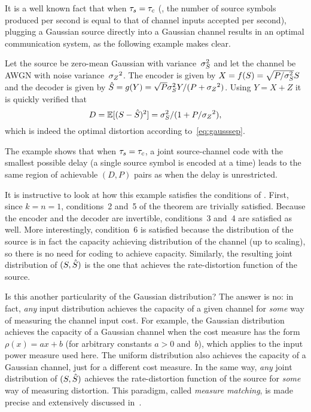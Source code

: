 It is a well known fact that when ${\tau_s} = {\tau_c}$ (\ie, the number of source symbols
produced per second is equal to that of channel inputs accepted per second),
plugging a Gaussian source directly into a Gaussian channel results in an
optimal communication system, as the following example makes clear.

\begin{example}
  \label{ex:gausssingle}
  Let the source be zero-mean Gaussian with variance~${\sigma_S^2}$ and let the channel
  be AWGN with noise variance~${{\sigma_Z}^2}$. The encoder is given by $X =
  f(S) = \sqrt{P/{\sigma_S^2}} S$ and the decoder is given by ${\hat{S}} = g(Y) = \sqrt{P}
  {\sigma_S^2} Y / (P + {{\sigma_Z}^2})$. Using $Y = X + Z$ it is quickly verified that
  \begin{equation*}
    D = \mathbb{E}[(S - {\hat{S}})^2] = {\sigma_S^2} / (1 + P/{{\sigma_Z}^2}),
  \end{equation*}
  which is indeed the optimal distortion according to~\eqref{eq:gausssep}.
\end{example}

The example shows that when ${\tau_s} = {\tau_c}$, a joint source-channel code with the
smallest possible delay (a single source symbol is encoded at a time) leads to
the same region of achievable $(D,P)$ pairs as when the delay is unrestricted.

It is instructive to look at how this example satisfies the conditions of
. First, since $k = n = 1$, conditions~2 and~5 of
the theorem are trivially satisfied. Because the encoder and the decoder are
invertible, conditions~3 and~4 are satisfied as well. More interestingly,
condition~6 is satisfied because the distribution of the source is in fact the
capacity achieving distribution of the channel (up to scaling), so there is no
need for coding to achieve capacity. Similarly, the resulting joint distribution
of $(S, {\hat{S}})$ is the one that achieves the rate-distortion function of the
source.

Is this another particularity of the Gaussian distribution? The answer is no: in
fact, \emph{any} input distribution achieves the capacity of a given channel for
\emph{some} way of measuring the channel input cost. For example, the Gaussian
distribution achieves the capacity of a Gaussian channel when the cost
measure has the form $\rho(x) = ax + b$ (for arbitrary constants $a > 0$
and~$b$), which applies to the input power measure used here. The uniform
distribution also achieves the capacity of a Gaussian channel, just for a
different cost measure. In the same way, \emph{any} joint distribution of $(S,
{\hat{S}})$ achieves the rate-distortion function of the source for \emph{some} way of
measuring distortion. This paradigm, called \emph{measure matching}, is made
precise and extensively discussed in~\cite{GastparRV2003}.


